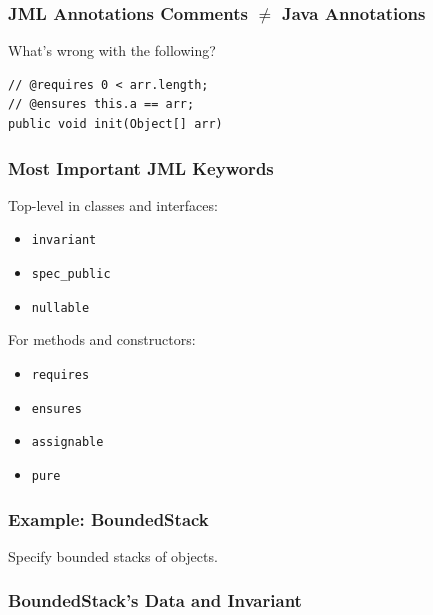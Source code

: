 \begin{frame}[fragile]
\frametitle{JML Annotations Comments $\neq$ Java Annotations}
\begin{question}
What's wrong with the following?
\rm

\begin{lstlisting}
// @requires 0 < arr.length;
// @ensures this.a == arr;
public void init(Object[] arr)
\end{lstlisting}
\end{question}
\end{frame}

\begin{frame}
\frametitle{Most Important JML Keywords}

Top-level in classes and interfaces:
\begin{itemize}
\item
\lstinline!invariant!

\item
\lstinline!spec_public!

\item
\lstinline!nullable!
\end{itemize}

For methods and constructors:
\begin{itemize}
\item
\lstinline!requires!

\item
\lstinline!ensures!

\item
\lstinline!assignable!

\item
\lstinline!pure!
\end{itemize}
\end{frame}

\begin{frame}
\frametitle{Example: BoundedStack}

\begin{example}
Specify bounded stacks of objects.
\end{example}

\end{frame}

\begin{frame}[fragile]
\frametitle{BoundedStack's Data and Invariant}

\end{frame}

